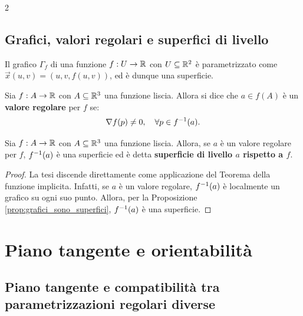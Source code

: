 \begin{multicols*}{2}
    \subsection{Grafici, valori regolari e superfici di livello}
    \begin{proposition} \label{prop:grafici_sono_superfici}
        Il grafico $\Gamma_f$ di una funzione $f : U \to \mathbb{R}$ con $U \subseteq \mathbb{R}^2$ è
        parametrizzato come $\vec{x}(u, v) = (u, v, f(u, v))$, ed è dunque una superficie.
    \end{proposition}

    \begin{definition}
        Sia $f : A \to \mathbb{R}$ con $A \subseteq \mathbb{R}^3$ una funzione liscia. Allora si dice che
        $a \in f(A)$ è un \textbf{valore regolare} per $f$ se:
        \[
            \nabla f(p) \neq 0, \quad \forall p \in f^{-1}(a).
        \]
    \end{definition}

    \begin{proposition}
        Sia $f : A \to \mathbb{R}$ con $A \subseteq \mathbb{R}^3$ una funzione liscia. Allora, se
        $a$ è un valore regolare per $f$, $f^{-1}(a)$ è una superficie ed è detta
        \textbf{superficie di livello $a$ rispetto a $f$}.
    \end{proposition}

    \begin{proof}
        La tesi discende direttamente come applicazione del Teorema della funzione
        implicita. Infatti, se $a$ è un valore regolare, $f^{-1}(a)$ è localmente
        un grafico su ogni suo punto. Allora, per la Proposizione \ref{prop:grafici_sono_superfici},
        $f^{-1}(a)$ è una superficie.
    \end{proof}

    \section{Piano tangente e orientabilità}

    \subsection{Piano tangente e compatibilità tra parametrizzazioni regolari diverse}


\end{multicols*}
